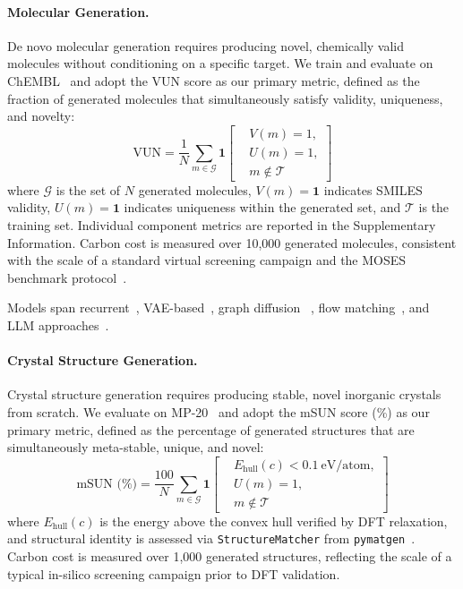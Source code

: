 \documentclass{article}
\theoremstyle{plain}
\theoremstyle{definition}
\theoremstyle{remark}
\begin{document}
\paragraph{Molecular Generation.}
De novo molecular generation requires producing novel, chemically valid molecules without conditioning on a specific target. We train and evaluate on ChEMBL~\cite{zdrazil2024chembl} and adopt the VUN score as our primary metric, defined as the fraction of generated molecules that simultaneously satisfy validity, uniqueness, and novelty:
\begin{equation}
\text{VUN}
= \frac{1}{N} \sum_{m \in \mathcal{G}}
\mathbf{1}\!\left[
\begin{aligned}
&V(m) = 1, \\
&U(m) = 1, \\
&m \notin \mathcal{T}
\end{aligned}
\right]
\end{equation}
where $\mathcal{G}$ is the set of $N$ generated molecules, $V(m) = \mathbf{1}$ indicates SMILES validity, $U(m) = \mathbf{1}$ indicates uniqueness within the generated set, and $\mathcal{T}$ is the training set. Individual component metrics are reported in the Supplementary Information. Carbon cost is measured over 10,000 generated molecules, consistent with the scale of a standard virtual screening campaign and the MOSES benchmark protocol~\cite{polykovskiy2020molecular}. 

Models span recurrent~\cite{olivecrona2017molecular}, VAE-based~\cite{jin2018junction, jin2020hierarchical}, graph diffusion ~\cite{vignac2022digress}, flow matching~\cite{dunn2024mixed}, and LLM approaches~\cite{cavanagh2024smileyllama}.


\paragraph{Crystal Structure Generation.}
Crystal structure generation requires producing stable, novel inorganic crystals from scratch. We evaluate on MP-20~\cite{xie2021crystal} and adopt the mSUN score (\%) as our primary metric, defined as the percentage of generated structures that are simultaneously meta-stable, unique, and novel:
\begin{equation}
\text{mSUN (\%)}
= \frac{100}{N} \sum_{m \in \mathcal{G}}
\mathbf{1}\!\left[
\begin{aligned}
&E_\text{hull}(c) < 0.1\ \text{eV/atom}, \\
&U(m) = 1, \\
&m \notin \mathcal{T}
\end{aligned}
\right]
\end{equation}
where $E_\text{hull}(c)$ is the energy above the convex hull verified by DFT relaxation, and structural identity is assessed via \texttt{StructureMatcher} from \texttt{pymatgen}~\cite{ong2013python}. Carbon cost is measured over 1,000 generated structures, reflecting the scale of a typical in-silico screening campaign prior to DFT validation.
\end{document}

